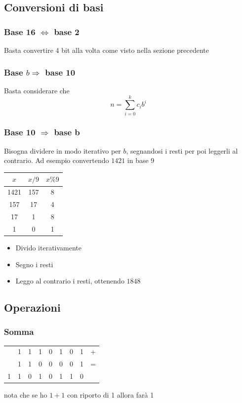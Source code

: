 \subsection{Conversioni di basi}
\subsubsection*{Base 16 $ \Leftrightarrow  $ base 2}
Basta convertire 4 bit alla volta come visto nella sezione precedente
\subsubsection*{Base  $ b \Rightarrow  $ base 10}
Basta considerare che
\[
	n = \sum_{i=0}^{k} c_i b^{i}
\]
\subsubsection*{Base 10 $ \Rightarrow  $ base b}
Bisogna dividere in modo iterativo per $ b $, segnandosi i resti per poi leggerli al contrario. Ad esempio convertendo $ 1421 $ in base 9
\vskip3mm
\begin{minipage}[c]{0.28\textwidth}
	\begin{tabular}{|c|c|c|}
		\hline
		$ x $ & $ x/9 $ & $ x\%9 $ \\
		\hline
		1421  & 157     & 8        \\
		157   & 17      & 4        \\
		17    & 1       & 8        \\
		1     & 0       & 1        \\
		\hline
	\end{tabular}
\end{minipage}
%
\begin{minipage}[c]{0.78\textwidth}
	\begin{itemize}
		\item Divido iterativamente
		\item Segno i resti
		\item Leggo al contrario i resti, ottenendo $ 1848 $
	\end{itemize}
\end{minipage}
\subsection{Operazioni}
\subsubsection*{Somma}
\begin{center}
	\begin{tabular}{c c c c c c c c | c}
		  & 1 & 1 & 1 & 0 & 1 & 0 & 1 & + \\
		  & 1 & 1 & 0 & 0 & 0 & 0 & 1 & = \\
		\hline
		1 & 1 & 0 & 1 & 0 & 1 & 1 & 0 &   \\
	\end{tabular}
\end{center}
nota che se ho $ 1+1 $ con riporto di 1 allora farà 1
